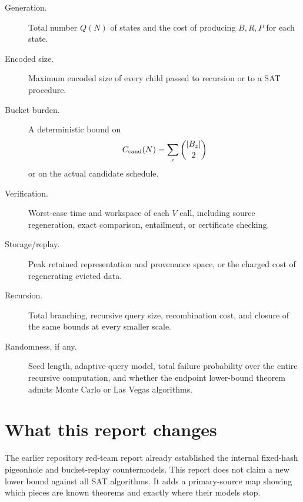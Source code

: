 \documentclass[11pt]{article}
\begin{document}
\begin{description}
\item[Generation.] Total number $Q(N)$ of states and the cost of producing
$B,R,P$ for each state.

\item[Encoded size.] Maximum encoded size of every child passed to recursion
or to a SAT procedure.

\item[Bucket burden.] A deterministic bound on
\[
  C_{\rm cand}(N)=\sum_z \binom{|B_z|}{2}
\]
or on the actual candidate schedule.

\item[Verification.] Worst-case time and workspace of each $V$ call, including
source regeneration, exact comparison, entailment, or certificate checking.

\item[Storage/replay.] Peak retained representation and provenance space, or
the charged cost of regenerating evicted data.

\item[Recursion.] Total branching, recursive query size, recombination cost,
and closure of the same bounds at every smaller scale.

\item[Randomness, if any.] Seed length, adaptive-query model, total failure
probability over the entire recursive computation, and whether the endpoint
lower-bound theorem admits Monte Carlo or Las Vegas algorithms.
\end{description}

\section{What this report changes}

The earlier repository red-team report already established the internal
fixed-hash pigeonhole and bucket-replay countermodels.  This report does not
claim a new lower bound against all SAT algorithms.  It adds a primary-source
map showing which pieces are known theorems and exactly where their models
stop.
\end{document}
